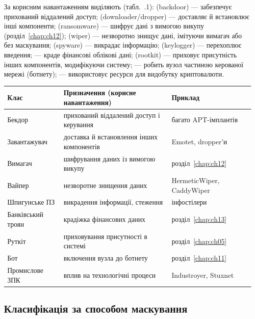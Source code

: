 За корисним навантаженням виділяють (табл.~\thechapter.1):  (backdoor) --- забезпечує прихований віддалений доступ;  (downloader/dropper) --- доставляє й встановлює інші компоненти;  (ransomware) --- шифрує дані з вимогою викупу (розділ~\ref{chap:ch12});  (wiper) --- незворотно знищує дані, імітуючи вимагач або без маскування;  (spyware) --- викрадає інформацію;  (keylogger) --- перехоплює введення;  --- краде фінансові облікові дані;  (rootkit) --- приховує присутність інших компонентів, модифікуючи систему;  --- робить вузол частиною керованої мережі (ботнету);  --- використовує ресурси для видобутку криптовалюти.


\begin{center}\footnotesize
\begin{tabularx}{\linewidth}{L{24mm} Y L{16mm}}
\toprule
Клас & Призначення (корисне навантаження) & Приклад \\
\midrule
Бекдор & прихований віддалений доступ і керування & багато APT-імплантів \\
Завантажувач & доставка й встановлення інших компонентів & Emotet, dropper'и \\
Вимагач & шифрування даних із вимогою викупу & розділ~\ref{chap:ch12} \\
Вайпер & незворотне знищення даних & HermeticWiper, CaddyWiper \\
Шпигунське ПЗ & викрадення інформації, стеження & інфостілери \\
Банківський троян & крадіжка фінансових даних & розділ~\ref{chap:ch13} \\
Руткіт & приховування присутності в системі & розділ~\ref{chap:ch05} \\
Бот & включення вузла до ботнету & розділ~\ref{chap:ch11} \\
Промислове ЗПК & вплив на технологічні процеси & Industroyer, Stuxnet \\
\bottomrule
\end{tabularx}
\end{center}

\subsection{Класифікація за способом маскування}

